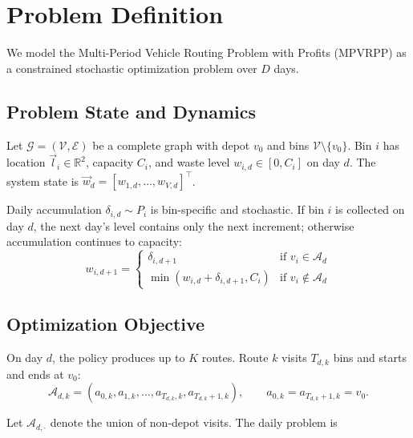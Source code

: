 \documentclass[orivec,runningheads]{llncs}
\begin{document}
\section{Problem Definition}
We model the Multi-Period Vehicle Routing Problem with Profits (MPVRPP) as a
constrained stochastic optimization problem over $D$ days.

\subsection{Problem State and Dynamics}
Let $\mathcal{G}=(\mathcal{V},\mathcal{E})$ be a complete graph with depot
$v_0$ and bins $\mathcal{V}\setminus\{v_0\}$. Bin $i$ has location
$\vec{l}_i\in\mathbb{R}^2$, capacity $C_i$, and waste level
$w_{i,d}\in[0,C_i]$ on day $d$. The system state is
$\vec{w}_d=[w_{1,d},\ldots,w_{V,d}]^\top$.

Daily accumulation $\delta_{i,d}\sim P_i$ is bin-specific and stochastic. If
bin $i$ is collected on day $d$, the next day's level contains only the next
increment; otherwise accumulation continues to capacity:
\begin{equation}
    w_{i, d+1} = 
    \begin{cases} 
        \delta_{i, d+1} & \text{if } v_i \in \mathcal{A}_d \\
        \min(w_{i, d} + \delta_{i, d+1}, C_i) & \text{if } v_i \notin \mathcal{A}_d
    \end{cases}
\end{equation}

\subsection{Optimization Objective}

On day $d$, the policy produces up to $K$ routes. Route $k$ visits
$T_{d,k}$ bins and starts and ends at $v_0$:
\begin{equation}
    \mathcal{A}_{d,k}=(a_{0,k},a_{1,k},\ldots,a_{T_{d,k},k},a_{T_{d,k}+1,k}),
    \qquad a_{0,k}=a_{T_{d,k}+1,k}=v_0.
\end{equation}

Let $\mathcal{A}_{d,\cdot}$ denote the union of non-depot visits. The daily
problem is
\end{document}
